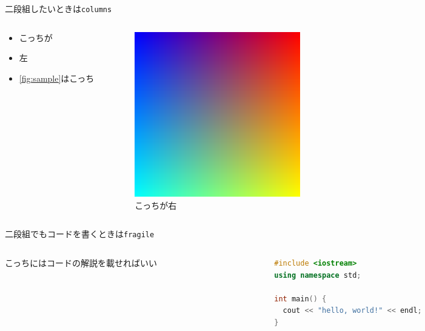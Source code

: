 \documentclass[unicode,12pt]{beamer}
\begin{document}
\begin{frame}[plain]{二段組したいときは\texttt{columns}}
  \begin{columns}[t]
    \begin{column}{0.5\textwidth}
      \begin{itemize}
      \item こっちが
      \item 左
      \item \autoref{fig:sample}はこっち
      \end{itemize}
    \end{column}
    \begin{column}{0.5\textwidth}
      \begin{figure}[htbp]
        \centering
        \includegraphics[width=0.45\textwidth]{sample.png}
        \caption{こっちが右}
        \label{fig:sample}
      \end{figure}
    \end{column}
  \end{columns}
\end{frame}

\begin{frame}[fragile]{二段組でもコードを書くときは\texttt{fragile}}
  \begin{columns}[t]
    \begin{column}{0.4\textwidth}
      こっちにはコードの解説を載せればいい
    \end{column}
    \begin{column}{0.6\textwidth}
      \begin{lstlisting}[language=c++,caption=C++のサンプルコード,label=code:cpp]
#include <iostream>
using namespace std;

int main() {
  cout << "hello, world!" << endl;
}
      \end{lstlisting}
    \end{column}
  \end{columns}
\end{frame}
\end{document}

